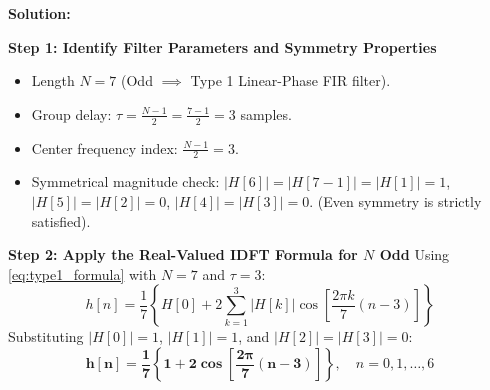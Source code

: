 \documentclass[11pt,a4paper]{article}
\begin{document}
\vspace{2mm}
\noindent\textbf{Solution:}

\noindent\textbf{Step 1: Identify Filter Parameters and Symmetry Properties}
\begin{itemize}
    \item Length $N = 7$ (Odd $\implies$ Type 1 Linear-Phase FIR filter).
    \item Group delay: $\tau = \frac{N-1}{2} = \frac{7-1}{2} = 3$ samples.
    \item Center frequency index: $\frac{N-1}{2} = 3$.
    \item Symmetrical magnitude check: $|H[6]| = |H[7-1]| = |H[1]| = 1$, $|H[5]| = |H[2]| = 0$, $|H[4]| = |H[3]| = 0$. (Even symmetry is strictly satisfied).
\end{itemize}

\noindent\textbf{Step 2: Apply the Real-Valued IDFT Formula for $N$ Odd}
Using \eqref{eq:type1_formula} with $N=7$ and $\tau = 3$:
\begin{equation}
h[n] = \frac{1}{7} \left\{ H[0] + 2 \sum_{k=1}^{3} |H[k]| \cos\left[ \frac{2\pi k}{7} (n - 3) \right] \right\}
\end{equation}
Substituting $|H[0]| = 1$, $|H[1]| = 1$, and $|H[2]| = |H[3]| = 0$:
\begin{equation}
\mathbf{h[n] = \frac{1}{7} \left\{ 1 + 2 \cos\left[ \frac{2\pi}{7} (n - 3) \right] \right\}}, \quad n = 0, 1, \dots, 6
\end{equation}
\end{document}
